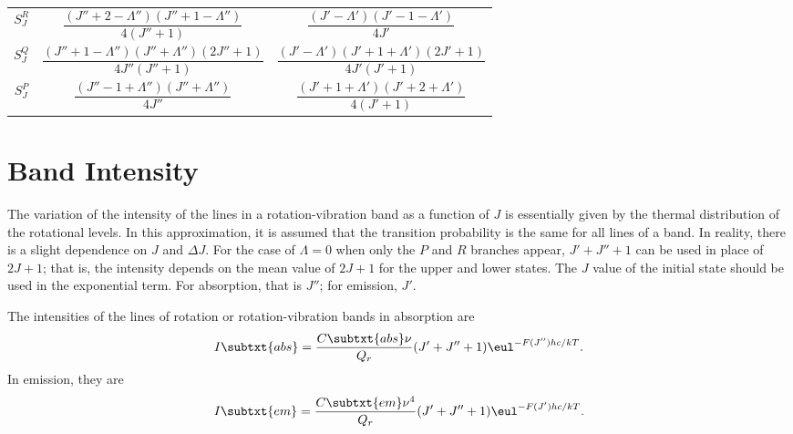 \begin{table}[H]
\begin{tabular}{ccc}
        $S_{J}^{R}$ & $\dfrac{(J'' + 2 - \Lambda'')(J'' + 1 - \Lambda'')}{4(J'' + 1)}$          & $\dfrac{(J' - \Lambda')(J' - 1 - \Lambda')}{4J'}$                  \\
        \addlinespace[0.5em]
        $S_{J}^{Q}$ & $\dfrac{(J'' + 1 - \Lambda'')(J'' + \Lambda'')(2J'' + 1)}{4J''(J'' + 1)}$ & $\dfrac{(J' - \Lambda')(J' + 1 + \Lambda')(2J' + 1)}{4J'(J' + 1)}$ \\
        \addlinespace[0.5em]
        $S_{J}^{P}$ & $\dfrac{(J'' - 1 + \Lambda'')(J'' + \Lambda'')}{4J''}$                    & $\dfrac{(J' + 1 + \Lambda')(J' + 2 + \Lambda')}{4(J' + 1)}$        \\
        \bottomrule
    \end{tabular}
\end{table}

\section{Band Intensity}
\label{s:band_intensity}

The variation of the intensity of the lines in a rotation-vibration band as a function of $J$ is essentially given by the thermal distribution of the rotational levels. In this approximation, it is assumed that the transition probability is the same for all lines of a band. In reality, there is a slight dependence on $J$ and $\Delta{}J$. For the case of $\Lambda = 0$ when only the $P$ and $R$ branches appear, $J' + J'' + 1$ can be used in place of $2J + 1$; that is, the intensity depends on the mean value of $2J + 1$ for the upper and lower states. The $J$ value of the initial state should be used in the exponential term. For absorption, that is $J''$; for emission, $J'$.

The intensities of the lines of rotation or rotation-vibration bands in absorption are
\begin{equation}
    I\subtxt{abs} = \frac{C\subtxt{abs}\nu}{Q_{r}}(J' + J'' + 1)\eul^{-F(J'')hc/kT}.
\end{equation}
In emission, they are
\begin{equation}
    I\subtxt{em} = \frac{C\subtxt{em}\nu^{4}}{Q_{r}}(J' + J'' + 1)\eul^{-F(J')hc/kT}.
\end{equation}
